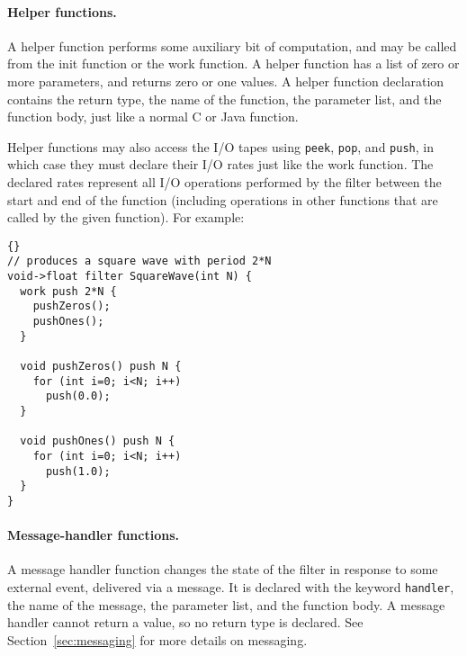 \documentclass[11pt]{article}
\newcommand{\new}{\marginpar{\footnotesize \textbf{~~--~New~--}}}
\begin{document}
\paragraph{Helper functions.}  A helper function performs some
auxiliary bit of computation, and may be called from the init function
or the work function.  A helper function has a list of zero or more
parameters, and returns zero or one values.  A helper function
declaration contains the return type, the name of the function, the
parameter list, and the function body, just like a normal C or Java
function.

Helper functions may also access the I/O tapes using \lstinline|peek|,
\lstinline|pop|, and \lstinline|push|, in which case they must declare
their I/O rates just like the work function.  The declared rates
represent all I/O operations performed by the filter between the start
and end of the function (including operations in other functions that
are called by the given function).  For example:

\begin{lstlisting}{}
// produces a square wave with period 2*N
void->float filter SquareWave(int N) {
  work push 2*N {
    pushZeros();
    pushOnes();
  }

  void pushZeros() push N {
    for (int i=0; i<N; i++)
      push(0.0);
  }

  void pushOnes() push N {
    for (int i=0; i<N; i++)
      push(1.0);
  }
}
\end{lstlisting}

\paragraph{Message-handler functions.}  A message handler function
changes the state of the filter in response to some external event,
delivered via a message.  It is declared with the keyword
\lstinline|handler|, the name of the message, the parameter list, and
the function body.  A message handler cannot return a value, so no
return type is declared.  See Section~\ref{sec:messaging} for more
details on messaging.

\end{document}
